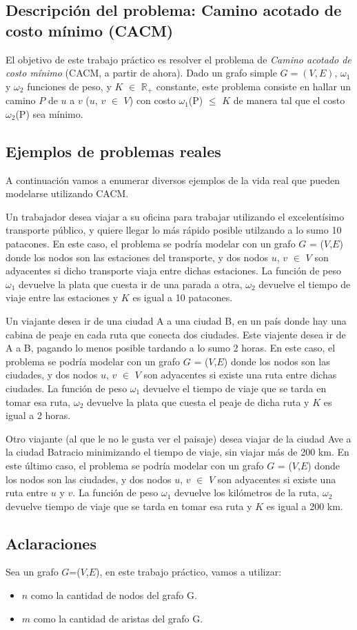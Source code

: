 \subsection{Descripción del problema: Camino acotado de costo mínimo (CACM)}
\label{sub:introduccion-descripcion}

El objetivo de este trabajo práctico es resolver el problema de \emph{Camino acotado de costo mínimo} (CACM, a partir de ahora). Dado un grafo simple $G = (V,E)$, $\omega_1$ y $\omega_2$ funciones de peso, y $K$ $\in$ $\mathbb{R}_+$ constante, este problema consiste en hallar un camino $P$ de $u$ a $v$ ($u$, $v$ $\in$ $V$) con costo $\omega_1$(P) $\leq$ $K$ de manera tal que el costo $\omega_2$(P) sea mínimo.

\subsection{Ejemplos de problemas reales}
\label{sub:introduccion-ejemplos}

A continuación vamos a enumerar diversos ejemplos de la vida real que pueden modelarse utilizando CACM.

Un trabajador desea viajar a su oficina para trabajar utilizando el excelentísimo transporte público, y quiere llegar lo más rápido posible utilzando a lo sumo 10 patacones. En este caso, el problema se podría modelar con un grafo $G$ = ($V$,$E$) donde los nodos son las estaciones del transporte, y dos nodos $u$, $v$ $\in$ $V$ son adyacentes si dicho transporte viaja entre dichas estaciones. La función de peso $\omega_1$ devuelve la plata que cuesta ir de una parada a otra, $\omega_2$ devuelve el tiempo de viaje entre las estaciones y $K$ es igual a 10 patacones.

Un viajante desea ir de una ciudad A a una ciudad B, en un país donde hay una cabina de peaje en cada ruta que conecta dos ciudades. Este viajente desea ir de A a B, pagando lo menos posible tardando a lo sumo 2 horas. En este caso, el problema se podría modelar con un grafo $G$ = ($V$,$E$) donde los nodos son las ciudades, y dos nodos $u$, $v$ $\in$ $V$ son adyacentes si existe una ruta entre dichas ciudades. La función de peso $\omega_1$ devuelve el tiempo de viaje que se tarda en tomar esa ruta, $\omega_2$ devuelve la plata que cuesta el peaje de dicha ruta y $K$ es igual a 2 horas.

Otro viajante (al que le no le gusta ver el paisaje) desea viajar de la ciudad Ave a la ciudad Batracio minimizando el tiempo de viaje, sin viajar más de 200 km. En este último caso, el problema se podría modelar con un grafo $G$ = ($V$,$E$) donde los nodos son las ciudades, y dos nodos $u$, $v$ $\in$ $V$ son adyacentes si existe una ruta entre $u$ y $v$. La función de peso $\omega_1$ devuelve los kilómetros de la ruta, $\omega_2$ devuelve tiempo de viaje que se tarda en tomar esa ruta y $K$ es igual a 200 km.

\subsection{Aclaraciones}

Sea un grafo $G$=($V$,$E$), en este trabajo práctico, vamos a utilizar:
\begin{itemize}
 \item $n$ como la cantidad de nodos del grafo G.
 \item $m$ como la cantidad de aristas del grafo G.
\end{itemize}
